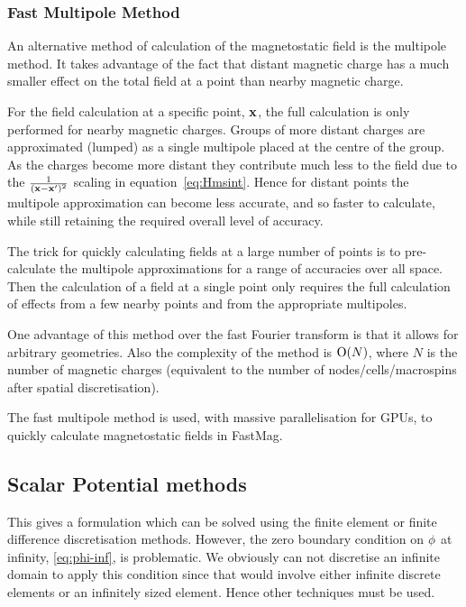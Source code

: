 \subsubsection{Fast Multipole Method}
\label{sec:fast-mult-meth}

An alternative method of calculation of the magnetostatic field is the multipole method. It takes advantage of the fact that distant magnetic charge has a much smaller effect on the total field at a point than nearby magnetic charge.

For the field calculation at a specific point, $\mathbf{x}$, the full calculation is only performed for nearby magnetic charges. Groups of more distant charges are approximated (lumped) as a single multipole placed at the centre of the group. As the charges become more distant they contribute much less to the field due to the $\frac{1}{(\mathbf{x} - \mathbf{x}')^2}$ scaling in equation~\eqref{eq:Hmsint}. Hence for distant points the multipole approximation can become less accurate, and so faster to calculate, while still retaining the required overall level of accuracy.

The trick for quickly calculating fields at a large number of points is to pre-calculate the multipole approximations for a range of accuracies over all space. Then the calculation of a field at a single point only requires the full calculation of effects from a few nearby points and from the appropriate multipoles.\cite{Beatson}

One advantage of this method over the fast Fourier transform is that it allows for arbitrary geometries. Also the complexity of the method is $\text{O}(N)$, where $N$ is the number of magnetic charges (equivalent to the number of nodes/cells/macrospins after spatial discretisation).\cite{Chang2011}

The fast multipole method is used, with massive parallelisation for GPUs, to quickly calculate magnetostatic fields in FastMag.\cite{Chang2011} %


\subsection{Scalar Potential methods}
\label{sec:magstat-field-calc-pote}

This gives a formulation which can be solved using the finite element or finite difference discretisation methods. However, the zero boundary condition on $\phi$ at infinity, \eqref{eq:phi-inf}, is problematic. We obviously can not discretise an infinite domain to apply this condition since that would involve either infinite discrete elements or an infinitely sized element. Hence other techniques must be used.

